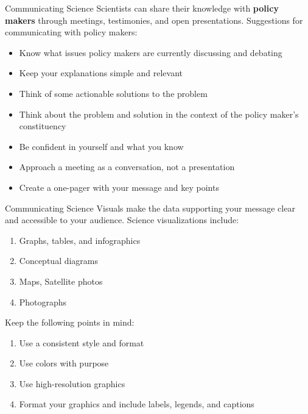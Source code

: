 \documentclass[
  ignorenonframetext,
  aspectratio=169]{beamer}
\providecommand{\tightlist}{%
  \setlength{\itemsep}{0pt}\setlength{\parskip}{0pt}}
\begin{document}
\begin{frame}{Communicating Science}
\label{communicating-science-3}
Scientists can share their knowledge with \textbf{policy makers} through
meetings, testimonies, and open presentations. Suggestions for
communicating with policy makers:

\begin{itemize}
\tightlist
\item
  Know what issues policy makers are currently discussing and debating
\item
  Keep your explanations simple and relevant
\item
  Think of some actionable solutions to the problem
\item
  Think about the problem and solution in the context of the policy
  maker's constituency
\item
  Be confident in yourself and what you know
\item
  Approach a meeting as a conversation, not a presentation
\item
  Create a one-pager with your message and key points
\end{itemize}
\end{frame}

\begin{frame}{Communicating Science}
\label{communicating-science-4}
Visuals make the data supporting your message clear and accessible to
your audience. Science visualizations include:

\begin{enumerate}
\tightlist
\item
  Graphs, tables, and infographics
\item
  Conceptual diagrams
\item
  Maps, Satellite photos
\item
  Photographs
\end{enumerate}

Keep the following points in mind:

\begin{enumerate}
\tightlist
\item
  Use a consistent style and format
\item
  Use colors with purpose
\item
  Use high-resolution graphics
\item
  Format your graphics and include labels, legends, and captions
\end{enumerate}
\end{frame}
\end{document}
